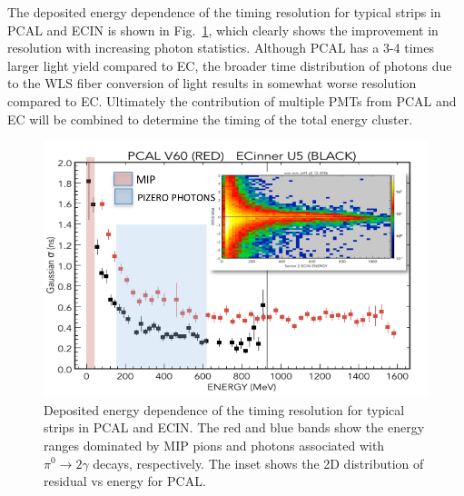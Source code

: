 The deposited energy dependence of the timing resolution for typical strips in PCAL and ECIN is shown in Fig.~\ref{fig:S9_2_2}, which clearly shows the improvement in resolution with increasing photon statistics.  Although PCAL has a 3-4 times larger light yield compared to EC, the broader time distribution of photons due to the WLS fiber conversion of light results in somewhat worse resolution compared to EC.  Ultimately the contribution of multiple PMTs from PCAL and EC will be combined to determine the timing of the total energy cluster.

\begin{figure}[hbt]
\centering
\includegraphics[width=1.0\columnwidth,keepaspectratio]{img/S9_2_2.png}
\caption[]{Deposited energy dependence of the timing resolution for typical strips in PCAL and ECIN.  The red and blue bands show the energy ranges dominated by MIP pions and photons associated with $\pi^0\rightarrow 2\gamma$ decays, respectively. The inset shows the 2D distribution of residual vs energy for PCAL.}
\label{fig:S9_2_2}
\end{figure}


